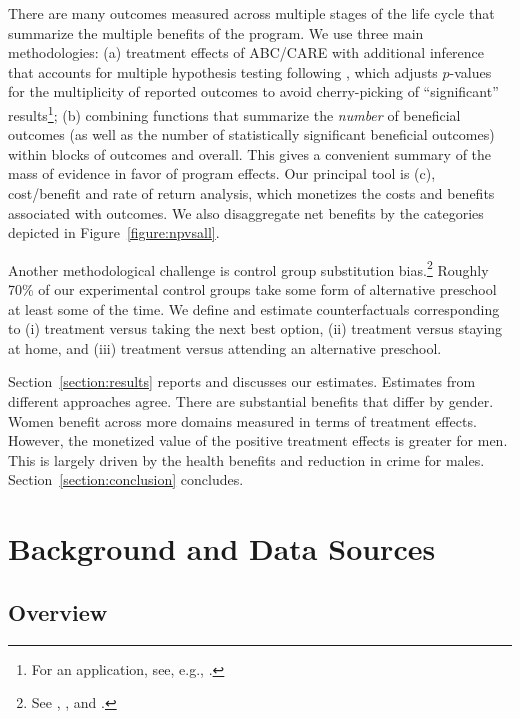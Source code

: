 There are many outcomes measured across multiple stages of the life cycle that summarize the multiple benefits of the program. We use three main methodologies: (a) treatment effects of ABC/CARE with additional inference that accounts for multiple hypothesis testing following \cite{Romano_Wolf_2005_JASA}, which adjusts $p$-values for the multiplicity of reported outcomes to avoid cherry-picking of ``significant'' results\footnote{For an application, see, e.g., \cite{Heckman_Moon_etal_2010_QE}.}; (b) combining functions that summarize the \emph{number} of beneficial outcomes (as well as the number of statistically significant beneficial outcomes) within blocks of outcomes and overall. This gives a convenient summary of the mass of evidence in favor of program effects. Our principal tool is (c), cost/benefit and rate of return analysis, which monetizes the costs and benefits associated with outcomes. We also disaggregate net benefits by the categories depicted in Figure~\ref{figure:npvsall}.

Another methodological challenge is control group substitution bias.\footnote{See \cite{Heckman_1992_randomization}, \cite{Heckman_Hohmann_etal_2000_QJE}, and \cite{Kline-Walters_2016_QJE}.} Roughly 70\% of our experimental control groups take some form of alternative preschool at least some of the time. We define and estimate counterfactuals corresponding to (i) treatment versus taking the next best option, (ii) treatment versus staying at home, and (iii) treatment versus attending an alternative preschool.

Section~\ref{section:results} reports and discusses our estimates. Estimates from different approaches agree. There are substantial benefits that differ by gender. Women benefit across more domains measured in terms of treatment effects. However, the monetized value of the positive treatment effects is greater for men. This is largely driven by the health benefits and reduction in crime for males. Section~\ref{section:conclusion} concludes.

\section[Background and Data Sources]{Background and Data Sources} \label{section:background}

\subsection{Overview}

